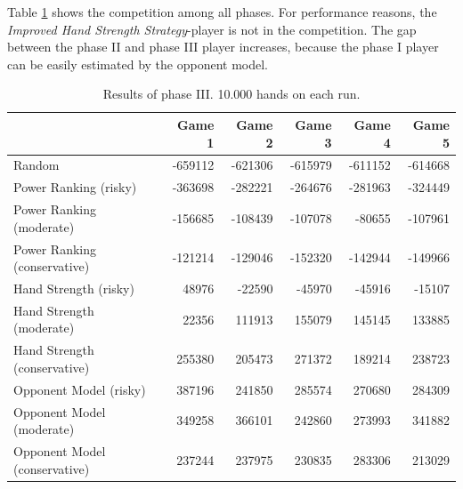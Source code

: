 Table \ref{tbl:resultsPhase3b} shows the competition among all phases. For performance reasons, the \emph{Improved Hand Strength Strategy}-player is not in the competition. The gap between the phase II and phase III player increases, because the phase I player can be easily estimated by the opponent model.
\begin{table}[h]
	\centering
	\begin{tabular}[h]{l|r|r|r|r|r}
		& \textbf{Game 1} & \textbf{Game 2} & \textbf{Game 3} & \textbf{Game 4} & \textbf{Game 5}\\
		\hline
		Random  & -659112 & -621306 & -615979 & -611152 & -614668\\
		Power Ranking (risky) & -363698 & -282221 & -264676 & -281963 & -324449\\
		Power Ranking (moderate) & -156685 & -108439 & -107078 & -80655 & -107961\\
		Power Ranking (conservative) & -121214 & -129046 & -152320 & -142944 & -149966\\
		Hand Strength (risky) & 48976 & -22590 & -45970 & -45916 & -15107\\
		Hand Strength (moderate) & 22356 & 111913 & 155079 & 145145 & 133885\\
		Hand Strength (conservative) & 255380 & 205473 & 271372 & 189214 & 238723\\
		Opponent Model (risky) & 387196 & 241850 & 285574 & 270680 & 284309\\
		Opponent Model (moderate) & 349258 & 366101 & 242860 & 273993 & 341882\\
		Opponent Model (conservative) & 237244 & 237975 & 230835 & 283306 & 213029\\
	\end{tabular}
	\label{tbl:resultsPhase3b}
	\caption{Results of phase III. 10.000 hands on each run.}
\end{table}

